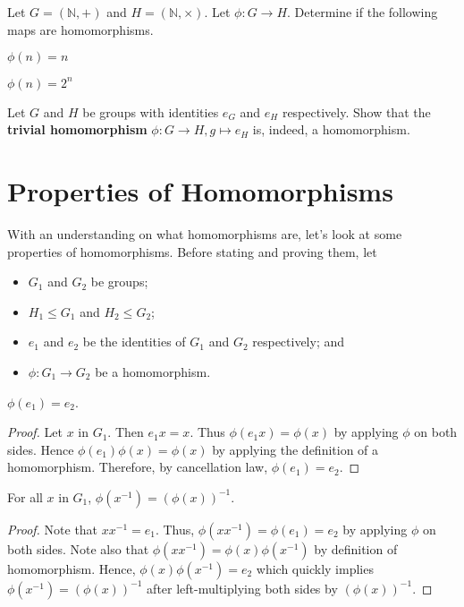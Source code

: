 \begin{exercise}
    Let $G = (\mathbb{N}, +)$ and $H = (\mathbb{N}, \times)$. Let $\phi: G \to H$. Determine if the following maps are homomorphisms.
    \begin{partquestions}{\alph*}
        \item $\phi(n) = n$
        \item $\phi(n) = 2^n$
    \end{partquestions}
\end{exercise}
\begin{exercise}
    Let $G$ and $H$ be groups with identities $e_G$ and $e_H$ respectively. Show that the \textbf{trivial homomorphism} $\phi: G \to H, g \mapsto e_H$ is, indeed, a homomorphism.
\end{exercise}

\section{Properties of Homomorphisms}
With an understanding on what homomorphisms are, let's look at some properties of homomorphisms. Before stating and proving them, let
\begin{itemize}
    \item $G_1$ and $G_2$ be groups;
    \item $H_1 \leq G_1$ and $H_2 \leq G_2$;
    \item $e_1$ and $e_2$ be the identities of $G_1$ and $G_2$ respectively; and
    \item $\phi: G_1 \to G_2$ be a homomorphism.
\end{itemize}

\begin{proposition}\label{prop-homomorphism-maps-identities-to-each-other}
    $\phi(e_1) = e_2$.
\end{proposition}
\begin{proof}
    Let $x$ in $G_1$. Then $e_1x = x$. Thus $\phi(e_1x) = \phi(x)$ by applying $\phi$ on both sides. Hence $\phi(e_1)\phi(x) = \phi(x)$ by applying the definition of a homomorphism. Therefore, by cancellation law, $\phi(e_1) = e_2$.
\end{proof}

\begin{proposition}\label{prop-homomorphism-maps-inverses}
    For all $x$ in $G_1$, $\phi(x^{-1}) = \left(\phi(x)\right)^{-1}$.
\end{proposition}
\begin{proof}
    Note that $xx^{-1} = e_1$. Thus, $\phi(xx^{-1}) = \phi(e_1) = e_2$ by applying $\phi$ on both sides. Note also that $\phi(xx^{-1}) = \phi(x)\phi(x^{-1})$ by definition of homomorphism. Hence, $\phi(x)\phi(x^{-1}) = e_2$ which quickly implies $\phi(x^{-1}) = \left(\phi(x)\right)^{-1}$ after left-multiplying both sides by $\left(\phi(x)\right)^{-1}$.
\end{proof}

